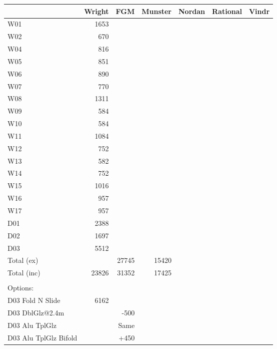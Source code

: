 \begin{tabular}{|p{4cm}||r|r|r|r|r|r|}
\hline
&Wright & FGM  &Munster &Nordan& Rational & Vindr           
\\ \hline
W01 & 1653                              
\\ \hline
W02 & 670                            
\\ \hline
W04 & 816                             
\\ \hline
W05 & 851                            
\\ \hline
W06 & 890                            
\\ \hline
W07 & 770                            
\\ \hline
W08 & 1311                            
\\ \hline
W09 & 584                            
\\ \hline
W10 & 584                             
\\ \hline
W11 &1084                            
\\ \hline
W12 & 752                       
\\ \hline
W13  &582                           
\\ \hline
W14 & 752                            
\\ \hline
W15 &1016                            
\\ \hline
W16 &957                            
\\ \hline
W17 &957                            
\\ \hline
D01 &2388                            
\\ \hline
D02 &1697                            
\\ \hline
D03 &5512                            
\\ \hline
Total (ex)  & & 27745  & 15420                  
\\ \hline
Total (inc) & 23826  &31352     &17425             
\\ \hline
\\ \hline
Options: 
\\ \hline
D03 Fold N Slide & 6162
\\ \hline
D03 DblGlz@2.4m & & -500
\\ \hline
D03 Alu TplGlz & & Same
\\ \hline
D03 Alu TplGlz Bifold& & +450
\\ \hline

\end{tabular}

